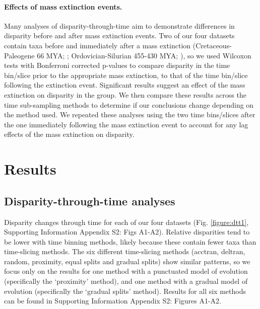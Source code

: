 \documentclass[12pt,a4paper]{article}
\begin{document}
\paragraph{Effects of mass extinction events.}
Many analyses of disparity-through-time aim to demonstrate differences in disparity before and after mass extinction events. 
Two of our four datasets contain taxa before and immediately after a mass extinction (Cretaceous-Paleogene 66 MYA; \citealt{beckancient2014}; Ordovician-Silurian 455-430 MYA; \citealt{wright2017bayesian}), so we used Wilcoxon tests with Bonferroni corrected p-values to compare disparity in the time bin/slice prior to the appropriate mass extinction, to that of the time bin/slice following the extinction event. 
Significant results suggest an effect of the mass extinction on disparity in the group.
We then compare these results across the time sub-sampling methods to determine if our conclusions change depending on the method used.
We repeated these analyses using the two time bins/slices after the one immediately following the mass extinction event to account for any lag effects of the mass extinction on disparity.

\section{Results} 

\subsection{Disparity-through-time analyses}

Disparity changes through time for each of our four datasets (Fig. \ref{figure:dtt1}, Supporting Information Appendix S2: Figs A1-A2). 
Relative disparities tend to be lower with time binning methods, likely because these contain fewer taxa than time-slicing methods.
The six different time-slicing methods (acctran, deltran, random, proximity, equal splits and gradual splits) show similar patterns, so we focus only on the results for one method with a punctuated model of evolution (specifically the `proximity' method), and one method with a gradual model of evolution (specifically the `gradual splits' method).
Results for all six methods can be found in Supporting Information Appendix S2: Figures A1-A2.
\end{document}
